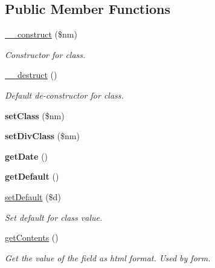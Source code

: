 \subsection*{Public Member Functions}
\begin{DoxyCompactItemize}
\item 
\hyperlink{class_date_list_ac610fc08cbb0781b26136636de129bc0}{\-\_\-\-\_\-construct} (\$nm)
\begin{DoxyCompactList}\small\item\em Constructor for class. \end{DoxyCompactList}\item 
\hypertarget{class_date_list_a421831a265621325e1fdd19aace0c758}{\hyperlink{class_date_list_a421831a265621325e1fdd19aace0c758}{\-\_\-\-\_\-destruct} ()}\label{class_date_list_a421831a265621325e1fdd19aace0c758}

\begin{DoxyCompactList}\small\item\em Default de-\/constructor for class. \end{DoxyCompactList}\item 
\hypertarget{class_date_list_a6f75ffe7d98c9e375394d63f8d379b2d}{{\bfseries set\-Class} (\$nm)}\label{class_date_list_a6f75ffe7d98c9e375394d63f8d379b2d}

\item 
\hypertarget{class_date_list_a4e25c00802ca9e9afb52a9177014fea7}{{\bfseries set\-Div\-Class} (\$nm)}\label{class_date_list_a4e25c00802ca9e9afb52a9177014fea7}

\item 
\hypertarget{class_date_list_a24d89b0ad05ea2e33626b1fc8ed59bc3}{{\bfseries get\-Date} ()}\label{class_date_list_a24d89b0ad05ea2e33626b1fc8ed59bc3}

\item 
\hypertarget{class_date_list_adc30a2a4d3e48cb6aee21562afbc4022}{{\bfseries get\-Default} ()}\label{class_date_list_adc30a2a4d3e48cb6aee21562afbc4022}

\item 
\hyperlink{class_date_list_aaf2bb7deba74bb0f994044954bd74ff3}{set\-Default} (\$d)
\begin{DoxyCompactList}\small\item\em Set default for class value. \end{DoxyCompactList}\item 
\hyperlink{class_date_list_a14814e04b348120748912692645f3a75}{get\-Contents} ()
\begin{DoxyCompactList}\small\item\em Get the value of the field as html format. Used by form. \end{DoxyCompactList}\end{DoxyCompactItemize}
